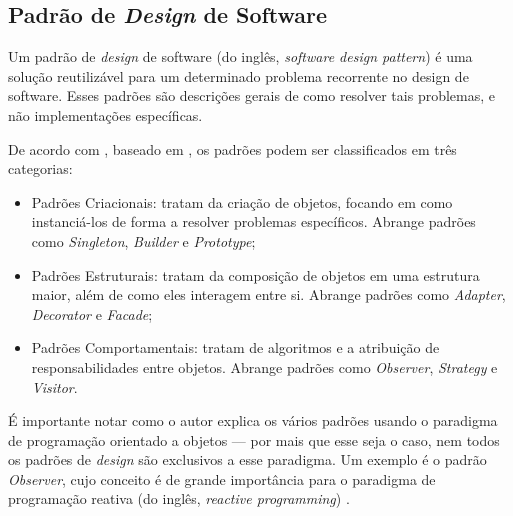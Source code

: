 \subsection{Padrão de \textit{Design} de Software}

Um padrão de \textit{design} de software (do inglês, \textit{software design pattern}) é uma solução reutilizável para um determinado problema recorrente no design de software. Esses padrões são descrições gerais de como resolver tais problemas, e não implementações específicas.

De acordo com , baseado em , os padrões podem ser classificados em três categorias:

\begin{itemize}
	\item Padrões Criacionais: tratam da criação de objetos, focando em como instanciá-los de forma a resolver problemas específicos. Abrange padrões como \textit{Singleton}, \textit{Builder} e \textit{Prototype};
	\item Padrões Estruturais: tratam da composição de objetos em uma estrutura maior, além de como eles interagem entre si. Abrange padrões como \textit{Adapter}, \textit{Decorator} e \textit{Facade};
	\item Padrões Comportamentais: tratam de algoritmos e a atribuição de responsabilidades entre objetos. Abrange padrões como \textit{Observer}, \textit{Strategy} e \textit{Visitor}.
\end{itemize}

É importante notar como o autor explica os vários padrões usando o paradigma de programação orientado a objetos — por mais que esse seja o caso, nem todos os padrões de \textit{design} são exclusivos a esse paradigma. Um exemplo é o padrão \textit{Observer}, cujo conceito é de grande importância para o paradigma de programação reativa (do inglês, \textit{reactive programming}) \cite{reactivex}.
